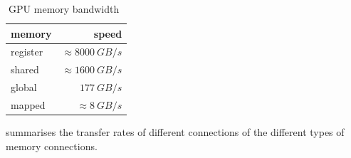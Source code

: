 \begin{table}[htb]
  \centering
  \begin{tabular}{l r}
    \toprule
    memory & speed \\
    \midrule
    register & $\approx \SI{8000}{GB/s}$ \\
    shared   & $\approx \SI{1600}{GB/s}$ \\
    global   & $\SI{177}{GB/s}$ \\
    mapped   & $\approx \SI{8}{GB/s}$ \\
  \end{tabular}
  \caption{GPU memory bandwidth~\cite{farber2011cuda}}
  \label{tab:hardware connections transfer rates}
\end{table}

 summarises the transfer rates of different connections of the different types of memory connections.
